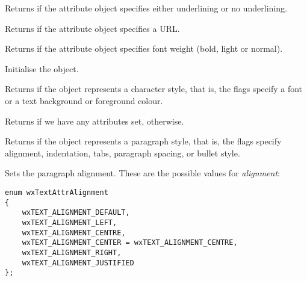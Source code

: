 Returns \true if the attribute object specifies either underlining or no underlining.

\label{wxrichtextattrhasurl}


Returns \true if the attribute object specifies a URL.

\label{wxrichtextattrhasweight}


Returns \true if the attribute object specifies font weight (bold, light or normal).

\label{wxrichtextattrinit}


Initialise the object.

\label{wxrichtextattrischaracterstyle}


Returns \true if the object represents a character style, that is,
the flags specify a font or a text background or foreground colour.

\label{wxrichtextattrisdefault}


Returns \false if we have any attributes set, \true otherwise.

\label{wxrichtextattrisparagraphstyle}


Returns \true if the object represents a paragraph style, that is,
the flags specify alignment, indentation, tabs, paragraph spacing, or
bullet style.

\label{wxrichtextattrsetalignment}


Sets the paragraph alignment. These are the possible values for {\it alignment}:

{\small
\begin{verbatim}
enum wxTextAttrAlignment
{
    wxTEXT_ALIGNMENT_DEFAULT,
    wxTEXT_ALIGNMENT_LEFT,
    wxTEXT_ALIGNMENT_CENTRE,
    wxTEXT_ALIGNMENT_CENTER = wxTEXT_ALIGNMENT_CENTRE,
    wxTEXT_ALIGNMENT_RIGHT,
    wxTEXT_ALIGNMENT_JUSTIFIED
};
\end{verbatim}
}


